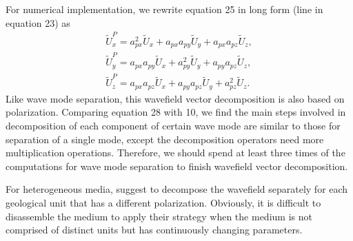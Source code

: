 For numerical implementation, we rewrite equation 25 in long form (line in equation 23) as 
\begin{equation}
\begin{array}{l}
\displaystyle
\tilde{U}^P_{x} = a_{px}^2\tilde{U}_{x} + a_{px}a_{py}\tilde{U}_{y} + a_{px}a_{pz}\tilde{U}_{z},
\nonumber \\
\displaystyle
\tilde{U}^P_{y} = a_{px}a_{py}\tilde{U}_{x} + a_{py}^2\tilde{U}_{y} + a_{py}a_{pz}\tilde{U}_{z},
\nonumber \\
\displaystyle
\tilde{U}^P_{z} = a_{px}a_{pz}\tilde{U}_{x} + a_{py}a_{pz}\tilde{U}_{y} + a_{pz}^2\tilde{U}_{z}.
\end{array}
\end{equation}
Like wave mode separation, this wavefield vector decomposition is also based on polarization. 
Comparing equation 28 with 10, we find the main steps involved in decomposition of each component of certain wave mode 
are similar to those for separation of a single mode, except the decomposition operators need more multiplication operations. 
Therefore, we should spend at least three times of the computations for wave mode separation to finish wavefield vector decomposition.

For heterogeneous media, \cite{zhang.mcmechan:2010} suggest to decompose the wavefield separately for 
each geological unit that has a different polarization. Obviously, it is difficult to disassemble the
 medium to apply their strategy when the medium is not comprised of distinct units but has continuously
 changing parameters.

